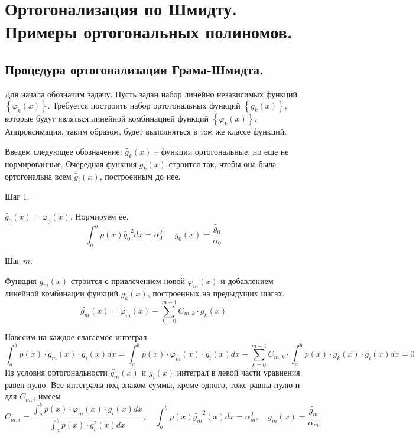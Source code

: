 \section{Ортогонализация по Шмидту. Примеры ортогональных полиномов.}\label{sec:ch15}

\subsection{Процедура ортогонализации Грама-Шмидта.}
Для начала обозначим задачу. Пусть задан набор линейно независимых функций $\left\{ \varphi_k(x) \right\}$. Требуется построить
набор ортогональных функций $\left\{ g_k(x) \right\}$, которые будут являться линейной комбинацией функций
$\left\{ \varphi_k(x) \right\}$. Аппроксимация, таким образом, будет выполняться в том же классе функций.

Введем следующее обозначение: $\tilde{g_k}(x)$ -- функции ортогональные, но еще не нормированные. Очередная функция
$\tilde{g_k}(x)$ строится так, чтобы она была ортогональна всем $\tilde{g_i}(x)$, построенным до нее.
\vspace{10pt}

Шаг 1.

$\displaystyle \tilde{g_0}(x) = \varphi_0(x)$. Нормируем ее.
\begin{equation*}
    \int_{a}^{b} p(x) \displaystyle \tilde{g_0}^2 dx = \alpha_0^2, \quad g_0(x) = \frac{\tilde{g_0}}{\alpha_0}
\end{equation*}

Шаг $m$.

Функция $\tilde{g_m}(x)$ строится с привлечением новой $\varphi_m(x)$ и добавлением линейной комбинации функций
$\displaystyle g_k(x)$, построенных на предыдущих шагах.
\begin{equation*}
    \tilde{g_m}(x) = \varphi_m(x) - \sum_{k=0}^{m-1} C_{m,k} \cdot g_k(x)
\end{equation*}

Навесим на каждое слагаемое интеграл:
\begin{equation*}
    \int_{a}^{b} p(x) \cdot \tilde{g_m}(x) \cdot g_i(x)dx = \int_{a}^{b} p(x) \cdot \varphi_m(x) \cdot g_i(x) dx - \sum_{k=0}^{m-1} C_{m, k} \cdot \int_{a}^{b} p(x) \cdot g_k(x) \cdot g_i(x)dx = 0
\end{equation*}
Из условия ортогональности $\displaystyle \tilde{g_m}(x)$ и $\displaystyle g_i(x)$ интеграл в левой части уравнения равен
нулю. Все интегралы под знаком суммы, кроме одного, тоже равны нулю и для $\displaystyle C_{m, i}$ имеем
\begin{equation*}
    C_{m,i} = \frac{\displaystyle \int_{a}^{b} p(x) \cdot \varphi_m(x) \cdot g_i(x) dx}{\displaystyle \int_{a}^{b} p(x) \cdot g_i^2(x)dx}, \quad \int_{a}^{b} p(x) \tilde{g_m}^2(x) dx = \alpha_m^2, \quad g_m(x) = \frac{\tilde{g_m}}{\alpha_m}
\end{equation*}


